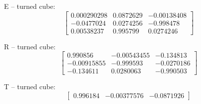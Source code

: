 E -- turned cube: 
\begin{equation*}
\begin{bmatrix}
0.000290298 & 0.0872629 & -0.00138408 \\ -0.0477024 & 0.0274256 & -0.998478 \\ 0.00538237 & 0.995799 & 0.0274246
\end{bmatrix}
\end{equation*}

R -- turned cube: 
\begin{equation*}
\begin{bmatrix}
0.990856 & -0.00543455 & -0.134813 \\ -0.00915855 & -0.999593 & -0.0270186 \\ -0.134611 & 0.0280063 & -0.990503
\end{bmatrix}
\end{equation*}

T -- turned cube: 
\begin{equation*}
\begin{bmatrix}
0.996184 & -0.00377576 & -0.0871926
\end{bmatrix}
\end{equation*}

